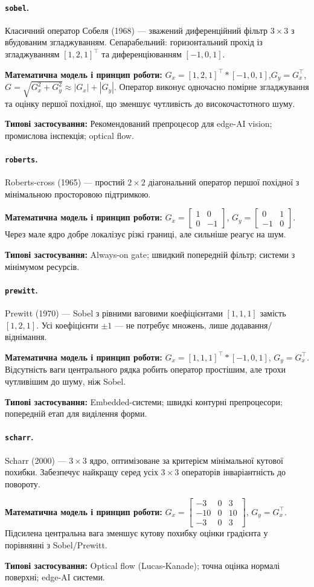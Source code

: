 \documentclass[a4paper,12pt]{article}
\newcommand{\algodesc}[6]{%
	\paragraph{\texttt{#1}.} #2

	\textbf{Математична модель і принцип роботи:} #3

	\textbf{Типові застосування:} #6
	\par\medskip
}
\begin{document}
\algodesc{sobel}
{Класичний оператор Собеля (1968) --- зважений диференційний фільтр $3\times3$ з вбудованим згладжуванням. Сепарабельний: горизонтальний прохід із згладжуванням $[1,2,1]^\top$ та диференціюванням $[-1,0,1]$.}
{
	$G_x = [1,2,1]^\top \ast [-1,0,1]$,\quad $G_y = G_x^\top$,\quad $G=\sqrt{G_x^2+G_y^2}\approx|G_x|+|G_y|$.
	Оператор виконує одночасно помірне згладжування та оцінку першої похідної, що зменшує чутливість до високочастотного шуму.
}
{Стійкий до шуму завдяки ваговому згладжуванню $[1,2,1]$; інваріантний до адитивних зсувів яскравості.}
{Анізотропний (H/V краї краще за діагональні); не дає sub-pixel точності.}
{Рекомендований препроцесор для edge-AI vision; промислова інспекція; optical flow.}

\algodesc{roberts}
{Roberts-cross (1965) --- простий $2\times2$ діагональний оператор першої похідної з мінімальною просторовою підтримкою.}
{$G_x=\begin{bmatrix}1&0\\0&-1\end{bmatrix}$, $G_y=\begin{bmatrix}0&1\\-1&0\end{bmatrix}$. Через мале ядро добре локалізує різкі границі, але сильніше реагує на шум.}
{Дуже легкий обчислювально; добре локалізує дрібні та різкі границі.}
{Не згладжує --- чутливий до шуму; орієнтований під 45°.}
{Always-on gate; швидкий попередній фільтр; системи з мінімумом ресурсів.}

\algodesc{prewitt}
{Prewitt (1970) --- Sobel з рівними ваговими коефіцієнтами $[1,1,1]$ замість $[1,2,1]$. Усі коефіцієнти $\pm1$ --- не потребує множень, лише додавання/віднімання.}
{$G_x=[1,1,1]^\top\ast[-1,0,1]$, $G_y=G_x^\top$. Відсутність ваги центрального рядка робить оператор простішим, але трохи чутливішим до шуму, ніж Sobel.}
{Без множень у базовій формі --- зручний для MCU з обмеженим набором арифметичних ресурсів.}
{Менш ефективне згладжування, ніж Sobel.}
{Embedded-системи; швидкі контурні препроцесори; попередній етап для виділення форми.}

\algodesc{scharr}
{Scharr (2000) --- $3\times3$ ядро, оптимізоване за критерієм мінімальної кутової похибки. Забезпечує найкращу серед усіх $3\times3$ операторів інваріантність до повороту.}
{$G_x=\begin{bmatrix}-3&0&3\\-10&0&10\\-3&0&3\end{bmatrix}$, $G_y=G_x^\top$. Підсилена центральна вага зменшує кутову похибку оцінки градієнта у порівнянні з Sobel/Prewitt.}
{Точніша оцінка орієнтації градієнта за стандартні $3\times3$ маски; часто застосовується в optical flow.}
{Більший шумовий gain (коефіцієнт 10).}
{Optical flow (Lucas-Kanade); точна оцінка нормалі поверхні; edge-AI системи.}
\end{document}
